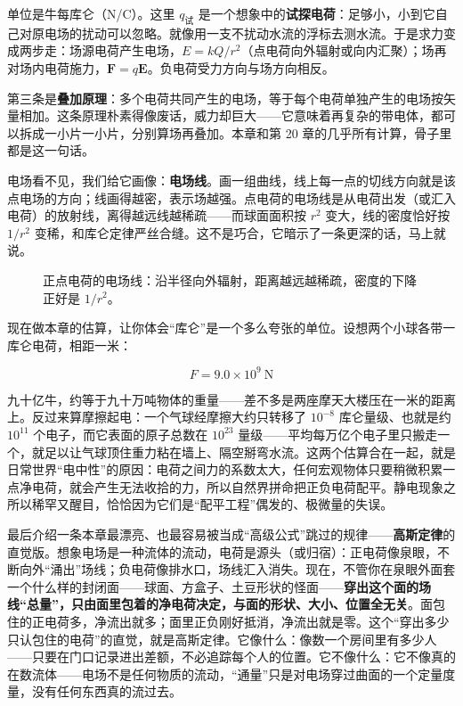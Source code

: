 \begin{mainline}
单位是牛每库仑（N/C）。这里 \(q_{\text{试}}\) 是一个想象中的\textbf{试探电荷}：足够小，小到它自己对原电场的扰动可以忽略。就像用一支不扰动水流的浮标去测水流。于是求力变成两步走：场源电荷产生电场，\(E = kQ/r^2\)（点电荷向外辐射或向内汇聚）；场再对场内电荷施力，\(\mathbf F = q\mathbf E\)。负电荷受力方向与场方向相反。

第三条是\textbf{叠加原理}：多个电荷共同产生的电场，等于每个电荷单独产生的电场按矢量相加。这条原理朴素得像废话，威力却巨大——它意味着再复杂的带电体，都可以拆成一小片一小片，分别算场再叠加。本章和第 20 章的几乎所有计算，骨子里都是这一句话。

电场看不见，我们给它画像：\textbf{电场线}。画一组曲线，线上每一点的切线方向就是该点电场的方向；线画得越密，表示场越强。点电荷的电场线是从电荷出发（或汇入电荷）的放射线，离得越远线越稀疏——而球面面积按 \(r^2\) 变大，线的密度恰好按 \(1/r^2\) 变稀，和库仑定律严丝合缝。这不是巧合，它暗示了一条更深的话，马上就说。
\end{mainline}

\begin{figure}[htbp]
\centering
{}
\caption{正点电荷的电场线：沿半径向外辐射，距离越远越稀疏，密度的下降正好是 \(1/r^2\)。}
\end{figure}

\begin{mainline}
现在做本章的估算，让你体会“库仑”是一个多么夸张的单位。设想两个小球各带一库仑电荷，相距一米：

\[ F = 9.0\times10^{9}\ \mathrm{N} \]

九十亿牛，约等于九十万吨物体的重量——差不多是两座摩天大楼压在一米的距离上。反过来算摩擦起电：一个气球经摩擦大约只转移了 \(10^{-8}\) 库仑量级、也就是约 \(10^{11}\) 个电子，而它表面的原子总数在 \(10^{23}\) 量级——平均每万亿个电子里只搬走一个，就足以让气球顶住重力粘在墙上、隔空掰弯水流。这两个估算合在一起，就是日常世界“电中性”的原因：电荷之间力的系数太大，任何宏观物体只要稍微积累一点净电荷，就会产生无法收拾的力，所以自然界拼命把正负电荷配平。静电现象之所以稀罕又醒目，恰恰因为它们是“配平工程”偶发的、极微量的失误。

最后介绍一条本章最漂亮、也最容易被当成“高级公式”跳过的规律——\textbf{高斯定律}的直觉版。想象电场是一种流体的流动，电荷是源头（或归宿）：正电荷像泉眼，不断向外“涌出”场线；负电荷像排水口，场线汇入消失。现在，不管你在泉眼外面套一个什么样的封闭面——球面、方盒子、土豆形状的怪面——\textbf{穿出这个面的场线“总量”，只由面里包着的净电荷决定，与面的形状、大小、位置全无关}。面包住的正电荷多，净流出就多；面里正负刚好抵消，净流出就是零。这个“穿出多少只认包住的电荷”的直觉，就是高斯定律。它像什么：像数一个房间里有多少人——只要在门口记录进出差额，不必追踪每个人的位置。它不像什么：它不像真的在数流体——电场不是任何物质的流动，“通量”只是对电场穿过曲面的一个定量度量，没有任何东西真的流过去。
\end{mainline}

